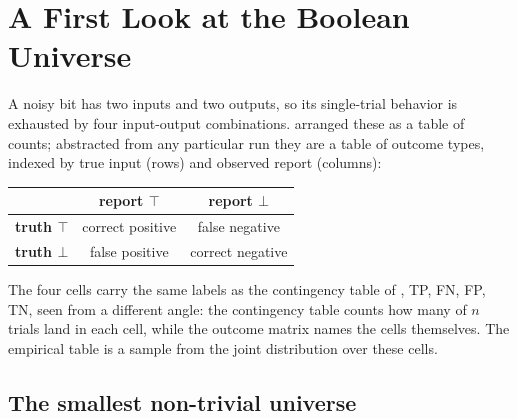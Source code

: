 %
%
%
%
%

\section{A First Look at the Boolean Universe}
\label{sec:boolean-universe-first-look}

A noisy bit has two inputs and two outputs, so its single-trial behavior is
exhausted by four input-output combinations. 
arranged these as a table of counts; abstracted from any particular run they
are a table of outcome types, indexed by true input (rows) and observed report
(columns):

\begin{center}
\begin{tabular}{l|cc}
\hline
              & \textbf{report $\top$} & \textbf{report $\bot$} \\
\hline
\textbf{truth $\top$} & correct positive & false negative \\
\textbf{truth $\bot$} & false positive   & correct negative \\
\hline
\end{tabular}
\end{center}

\noindent
The four cells carry the same labels as the contingency table of
, TP, FN, FP, TN, seen from a different angle: the
contingency table counts how many of $n$ trials land in each cell, while the
outcome matrix names the cells themselves. The empirical table is a sample from
the joint distribution over these cells.

\subsection*{The smallest non-trivial universe}

